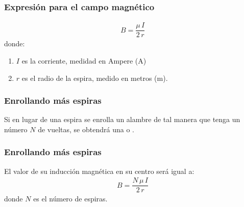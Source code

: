 \documentclass[14pt]{beamer}
\begin{document}
\begin{frame}
\frametitle{Expresión para el campo magnético}
\begin{align*}
B = \dfrac{\mu \, I}{2 \, r}
\end{align*}    
donde:
\begin{enumerate}[<+->]
\conti
\item $I$ es la corriente, medidad en Ampere (A)
\item $r$ es el radio de la espira, medido en metros (m).
\end{enumerate}
\end{frame}
\begin{frame}
\frametitle{Enrollando más espiras}
Si en lugar de una espira se enrolla un alambre de tal manera que tenga un número $N$ de vueltas, \pause se obtendrá una  o . 
\end{frame}
\begin{frame}
\frametitle{Enrollando más espiras}
El valor de su inducción magnética en su centro será igual a:
\pause
\begin{align*}
B = \dfrac{N \, \mu \, I}{2 \, r}
\end{align*}
donde $N$ es el número de espiras.
\end{frame}
\end{document}
